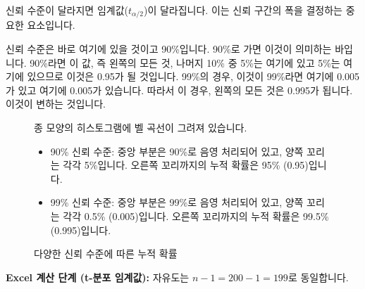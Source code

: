 \documentclass[11pt,a4paper]{article}
\begin{document}
신뢰 수준이 달라지면 임계값($t_{\alpha/2}$)이 달라집니다. 이는 신뢰 구간의 폭을 결정하는 중요한 요소입니다.

\begin{tcolorbox}[title=슬라이드 56: 뉴욕 일일 기온 샘플 Excel 시트 (3/13)]
신뢰 수준은 바로 여기에 있을 것이고 90\%입니다. 90\%로 가면 이것이 의미하는 바입니다. 90\%라면 이 값, 즉 왼쪽의 모든 것, 나머지 10\% 중 5\%는 여기에 있고 5\%는 여기에 있으므로 이것은 0.95가 될 것입니다. 99\%의 경우, 이것이 99\%라면 여기에 0.005가 있고 여기에 0.005가 있습니다. 따라서 이 경우, 왼쪽의 모든 것은 0.995가 됩니다. 이것이 변하는 것입니다.
\end{tcolorbox}

\begin{figure}[h!]
    \centering
    \begin{tcolorbox}[colback=myyellow!10!white, colframe=myyellow!75!black, title=그림 설명: 다양한 신뢰 수준에 따른 누적 확률]
    종 모양의 히스토그램에 벨 곡선이 그려져 있습니다.
    \begin{itemize}
        \item 90\% 신뢰 수준: 중앙 부분은 90\%로 음영 처리되어 있고, 양쪽 꼬리는 각각 5\%입니다. 오른쪽 꼬리까지의 누적 확률은 95\% (0.95)입니다.
        \item 99\% 신뢰 수준: 중앙 부분은 99\%로 음영 처리되어 있고, 양쪽 꼬리는 각각 0.5\% (0.005)입니다. 오른쪽 꼬리까지의 누적 확률은 99.5\% (0.995)입니다.
    \end{itemize}
    \end{tcolorbox}
    \caption{다양한 신뢰 수준에 따른 누적 확률}
    \label{fig:confidence_level_prob}
\end{figure}

\textbf{Excel 계산 단계 (t-분포 임계값):}
자유도는 $n-1 = 200-1 = 199$로 동일합니다.
\end{document}

